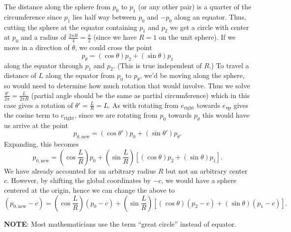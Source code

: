 \documentclass[a4paper,10pt]{article}
\begin{document}
The distance along the sphere from \(p_0\) to \(p_1\) (or any other pair)
is a quarter of the circumference since \(p_1\) lies half way between
\(p_0\) and \(-p_0\) along an equator. Thus, cutting the sphere at the
equator containing \(p_1\) and \(p_2\) we get a circle with center at
\(p_0\) and a radius of \(\frac{2 \pi R}{4} = \frac{\pi}{2}\) (since we
have \(R = 1\) on the unit sphere). If we move in a direction of \(\theta\),
we could cross the point
\[p_{\theta} = \left(\cos \theta\right) p_2 + \left(\sin \theta\right) p_1\]
along the equator through \(p_1\) and \(p_2\). (This is true independent
of \(R\).) To travel a distance of
\(L\) along the equator from \(p_0\) to \(p_{\theta}\), we'd be moving
along the sphere, so would need to determine how much rotation that would
involve. Thus we solve \(\frac{\theta'}{2 \pi} = \frac{L}{2 \pi R}\) (partial
angle should be the same as partial circumference) which
in this case gives a rotation of \(\theta' = \frac{L}{R} = L\). As with
rotating from
\(e_{\text{right}}\) towards \(e_{\text{up}}\) gives the cosine term
to \(e_{\text{right}}\), since we are rotating from \(p_0\) towards
\(p_{\theta}\) this would have us arrive at the point
\[p_{0, \text{new}} = \left(\cos \theta'\right) p_0 +
\left(\sin \theta'\right) p_{\theta}.\]
Expanding, this becomes
\[p_{0, \text{new}} = \left(\cos \frac{L}{R}\right) p_0 +
\left(\sin \frac{L}{R}\right) \left[\left(\cos \theta\right) p_2 +
\left(\sin \theta\right) p_1\right].\]
We have already accounted for an arbitrary radius \(R\) but not an
arbitrary center \(c\). However, by shifting the global coordinates by
\(-c\), we would have a sphere centered at the origin, hence we can change
the above to
\[\left(p_{0, \text{new}} - c\right) = \left(\cos \frac{L}{R}\right)
\left(p_0 - c\right) +
\left(\sin \frac{L}{R}\right) \left[\left(\cos \theta\right) \left(p_2
 - c\right) + \left(\sin \theta\right) \left(p_1 - c\right)\right].\]

\textbf{NOTE}: Most mathematicians use the term ``great circle'' instead
of equator.
\end{document}
